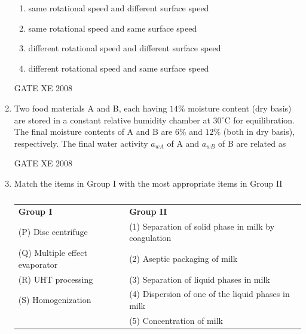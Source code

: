 \documentclass[12pt]{article}
\begin{document}
\begin{enumerate}[label=Q\arabic*.]
\begin{enumerate}[label=(\Alph*)]
\item  same rotational speed and different surface speed 
\item  same rotational speed and same surface speed  
\item  different rotational speed and different surface speed  
\item  different rotational speed and same surface speed  
\end{enumerate}

GATE XE 2008  

\item Two food materials A and B, each having $14\%$ moisture content (dry basis) are stored in a constant relative humidity chamber at $30^{\circ} \mathrm{C}$ for equilibration. The final moisture contents of A and B are $6\%$ and $12\%$ (both in dry basis), respectively. The final water activity $a_{wA}$ of A and $a_{wB}$ of B are related as  

\begin{enumerate}[label=(\Alph*)]
\end{enumerate}

GATE XE 2008  

\item Match the items in Group I with the most appropriate items in Group II  

\begin{table}[H]     \centering     \caption{}     \label{}     \begin{tabular}{p{7cm} p{7cm}}
\textbf{Group I} & \textbf{Group II} \\
(P) Disc centrifuge & (1) Separation of solid phase in milk by coagulation \\
(Q) Multiple effect evaporator & (2) Aseptic packaging of milk \\
(R) UHT processing & (3) Separation of liquid phases in milk \\
(S) Homogenization & (4) Dispersion of one of the liquid phases in milk \\
& (5) Concentration of milk \\
\end{tabular} \end{table}  


\end{enumerate}
\end{document}
